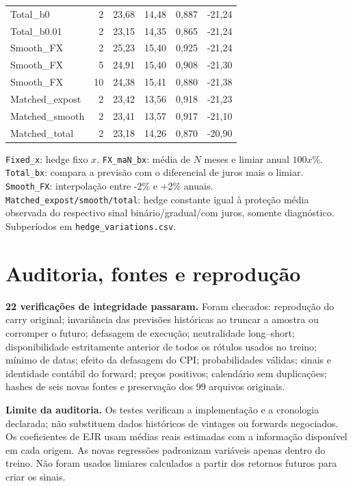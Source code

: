 \documentclass[11pt,a4paper]{article}
\begin{document}
\begin{center}
\begin{tabular}{lrrrrr}
Total\_b0 & 2 & 23,68 & 14,48 & 0,887 & -21,24 \\
Total\_b0.01 & 2 & 23,15 & 14,35 & 0,865 & -21,24 \\
Smooth\_FX & 2 & 25,23 & 15,40 & 0,925 & -21,24 \\
Smooth\_FX & 5 & 24,91 & 15,40 & 0,908 & -21,30 \\
Smooth\_FX & 10 & 24,38 & 15,41 & 0,880 & -21,38 \\
Matched\_expost & 2 & 23,42 & 13,56 & 0,918 & -21,23 \\
Matched\_smooth & 2 & 23,41 & 13,57 & 0,917 & -21,10 \\
Matched\_total & 2 & 23,18 & 14,26 & 0,870 & -20,90 \\
\bottomrule\end{tabular}\end{center}\normalsize

\texttt{Fixed\_x}: hedge fixo $x$. \texttt{FX\_maN\_bx}: média de $N$ meses e limiar anual $100x$\%. \texttt{Total\_bx}: compara a previsão com o diferencial de juros mais o limiar. \texttt{Smooth\_FX}: interpolação entre -2\% e +2\% anuais. \texttt{Matched\_expost/smooth/total}: hedge constante igual à proteção média observada do respectivo sinal binário/gradual/com juros, somente diagnóstico. Subperíodos em \texttt{hedge\_variations.csv}.

\clearpage

\section*{Auditoria, fontes e reprodução}
\textbf{22 verificações de integridade passaram.} Foram checados: reprodução do carry original; invariância das previsões históricas ao truncar a amostra ou corromper o futuro; defasagem de execução; neutralidade long--short; disponibilidade estritamente anterior de todos os rótulos usados no treino; mínimo de datas; efeito da defasagem do CPI; probabilidades válidas; sinais e identidade contábil do forward; preços positivos; calendário sem duplicações; hashes de seis novas fontes e preservação dos 99 arquivos originais.

\textbf{Limite da auditoria.} Os testes verificam a implementação e a cronologia declarada; não substituem dados históricos de vintages ou forwards negociados. Os coeficientes de EJR usam médias reais estimadas com a informação disponível em cada origem. As novas regressões padronizam variáveis apenas dentro do treino. Não foram usados limiares calculados a partir dos retornos futuros para criar os sinais.
\end{document}
